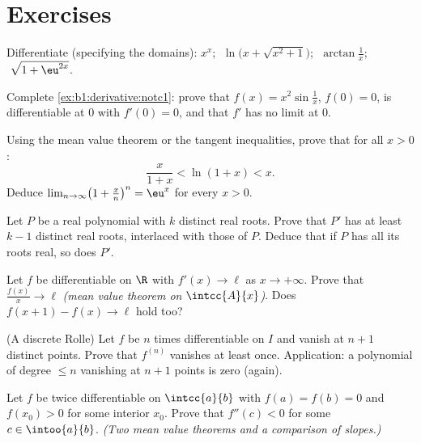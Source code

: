 \section{Exercises}

\begin{exercise}[$\star$]\label{exo:b1:derivative:1}
Differentiate (specifying the domains): $x^x$;
$\;\ln\bigl(x + \sqrt{x^2+1}\bigr)$; $\;\arctan\frac{1}{x}$;
$\;\sqrt{1 + \eu^{2x}}$.
\end{exercise}

\begin{exercise}[$\star$]\label{exo:b1:derivative:2}
Complete \cref{ex:b1:derivative:notc1}: prove that $f(x) = x^2
\sin\frac1x$, $f(0) = 0$, is differentiable at $0$ with $f'(0) = 0$,
and that $f'$ has no limit at $0$.
\end{exercise}

\begin{exercise}[$\star$]\label{exo:b1:derivative:3}
Using the mean value theorem or the tangent inequalities, prove that
for all $x > 0$:
\[
\frac{x}{1 + x} < \ln(1 + x) < x .
\]
Deduce $\lim_{n\to\infty} \bigl(1 + \frac xn\bigr)^n = \eu^x$ for
every $x > 0$.
\end{exercise}

\begin{exercise}[$\star$]\label{exo:b1:derivative:4}
Let $P$ be a real polynomial with $k$ distinct real roots. Prove that
$P'$ has at least $k - 1$ distinct real roots, interlaced with those
of $P$. Deduce that if $P$ has all its roots real, so does $P'$.
\end{exercise}

\begin{exercise}[$\star\star$]\label{exo:b1:derivative:5}
Let $f$ be differentiable on $\R$ with $f' (x)\to \ell$ as $x \to
+\infty$. Prove that $\frac{f(x)}{x} \to \ell$ \emph{(mean value
theorem on $\intcc{A}{x}$)}. Does $f(x+1) - f(x) \to \ell$ hold too?
\end{exercise}

\begin{exercise}[$\star\star$]\label{exo:b1:derivative:6}
(A discrete Rolle) Let $f$ be $n$ times differentiable on $I$ and
vanish at $n + 1$ distinct points. Prove that $f^{(n)}$ vanishes at
least once. Application: a polynomial of degree $\leq n$ vanishing at
$n+1$ points is zero (again).
\end{exercise}

\begin{exercise}[$\star\star$]\label{exo:b1:derivative:7}
Let $f$ be twice differentiable on $\intcc{a}{b}$ with $f(a) = f(b)
= 0$ and $f(x_0) > 0$ for some interior $x_0$. Prove that $f''(c) <
0$ for some $c \in \intoo{a}{b}$. \emph{(Two mean value theorems and
a comparison of slopes.)}
\end{exercise}

